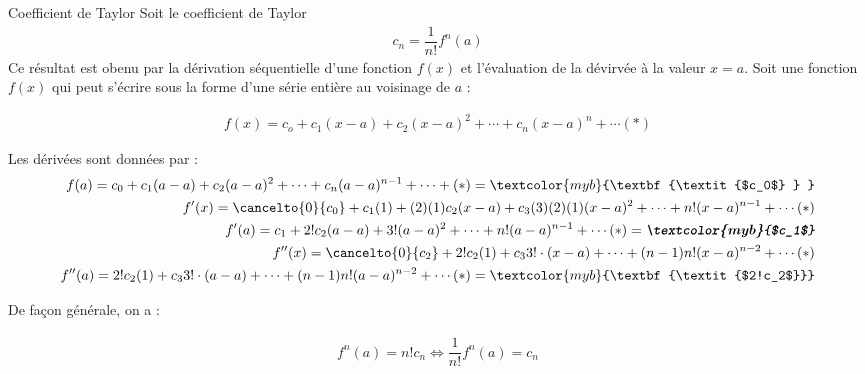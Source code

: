 \documentclass{report}
\begin{document}
\begin{Preuve}{Coefficient de Taylor}{}
    Soit le coefficient de Taylor 
    \begin{align*}
        c_n = \dfrac{1}{n!}f^{n}(a)
    \end{align*}
     Ce résultat est obenu par la dérivation séquentielle d'une fonction 
     $f(x)$ et l'évaluation de la dévirvée à la valeur $x = a$. 
     Soit une fonction $f(x)$ qui peut s'écrire sous la forme d'une série 
     entière au voisinage de $a$ : 

     \begin{align*}
        f(x) = c_o  + c_1(x - a) + c_2(x - a)^2 + \cdots + c_n(x - a)^n 
        + \cdots (*)
     \end{align*}

     Les dérivées sont données par : 
     \begin{align*}
         f(a) = c_0 + c_1(a - a) + c_2(a -a)^2 + \cdots + c_n(a - a)^{n - 1} + \cdots + (*)  
         = \textcolor{myb}{\textbf{\textit{$c_0$}  }  }  \\
        f^{\prime}(x) = 
        \cancelto{0}{c_0} + c_1(1) + (2)(1)c_2(x - a) + 
        c_3(3)(2)(1)(x - a)^2 + \cdots + n!(x - a)^{n-1} + \cdots (*) \\ 
        f^{\prime}(a) =  c_1 + 2!c_2(a - a) + 3!(a - a)^2 + \cdots + n!(a - a)^{n - 1} + 
        \cdots (*) = \textbf{\textit{\textcolor{myb}{$c_1$}}}  \\ 
         f^{\prime\prime}(x) = 
         \cancelto{0}{c_2} + 2!c_2(1) + 
        c_33!\cdot(x - a) + \cdots + (n-1)n!(x - a)^{n-2} + \cdots (*) \\ 
         f^{\prime\prime}(a) = 
          2!c_2(1) + 
        c_33!\cdot(a - a) + \cdots + (n-1)n!(a - a)^{n-2} + \cdots (*)   
        = \textcolor{myb}{\textbf{\textit{$2!c_2$}}}  
     \end{align*}

     De façon générale, on a : 

     \begin{align*}
         \boxed{f^{n}(a) = n!c_n \Leftrightarrow \dfrac{1}{n!}f^{n}(a) = c_n}
     \end{align*}






    



\end{Preuve}
\end{document}
